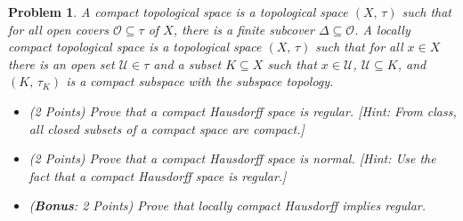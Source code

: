 \documentclass{article}
\theoremstyle{normal}
\newtheorem{problem}{Problem}
\begin{document}
    \begin{problem}
        A compact topological space is a topological space
        $(X,\,\tau)$ such that for all open covers $\mathcal{O}\subseteq\tau$
        of $X$, there is a finite subcover $\Delta\subseteq\mathcal{O}$. A
        locally compact topological space is a topological space
        $(X,\,\tau)$ such that for all $x\in{X}$ there is an open set
        $\mathcal{U}\in\tau$ and a subset $K\subseteq{X}$ such that
        $x\in\mathcal{U}$, $\mathcal{U}\subseteq{K}$, and
        $(K,\,\tau_{K})$ is a compact subspace with the subspace topology.
        \begin{itemize}
            \item (2 Points)
                Prove that a compact Hausdorff space is regular.
                [Hint: From class, all closed subsets of a compact space are
                compact.]
            \item (2 Points)
                Prove that a compact Hausdorff space is normal.
                [Hint: Use the fact that a compact Hausdorff space is regular.]
            \item (\textbf{Bonus}: 2 Points) Prove that locally compact
                Hausdorff implies regular.
        \end{itemize}
    \end{problem}
\end{document}
